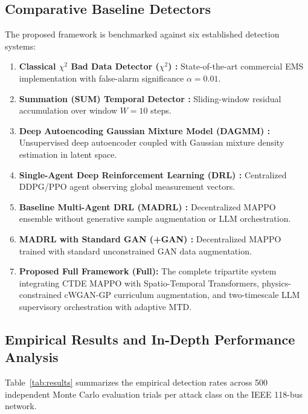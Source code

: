 \documentclass[journal,compsoc]{IEEEtran}
\begin{document}
\subsection{Comparative Baseline Detectors}
The proposed framework is benchmarked against six established detection systems:
\begin{enumerate}
    \item \textbf{Classical $\chi^2$ Bad Data Detector ($\chi^2$) \cite{ref10}:} State-of-the-art commercial EMS implementation with false-alarm significance $\alpha = 0.01$.
    \item \textbf{Summation (SUM) Temporal Detector \cite{ref18}:} Sliding-window residual accumulation over window $W = 10$ steps.
    \item \textbf{Deep Autoencoding Gaussian Mixture Model (DAGMM) \cite{ref40}:} Unsupervised deep autoencoder coupled with Gaussian mixture density estimation in latent space.
    \item \textbf{Single-Agent Deep Reinforcement Learning (DRL) \cite{ref34}:} Centralized DDPG/PPO agent observing global measurement vectors.
    \item \textbf{Baseline Multi-Agent DRL (MADRL) \cite{ref53}:} Decentralized MAPPO ensemble without generative sample augmentation or LLM orchestration.
    \item \textbf{MADRL with Standard GAN (+GAN) \cite{ref70}:} Decentralized MAPPO trained with standard unconstrained GAN data augmentation.
    \item \textbf{Proposed Full Framework (Full):} The complete tripartite system integrating CTDE MAPPO with Spatio-Temporal Transformers, physics-constrained cWGAN-GP curriculum augmentation, and two-timescale LLM supervisory orchestration with adaptive MTD.
\end{enumerate}

\subsection{Empirical Results and In-Depth Performance Analysis}
Table~\ref{tab:results} summarizes the empirical detection rates across 500 independent Monte Carlo evaluation trials per attack class on the IEEE 118-bus network.
\end{document}
